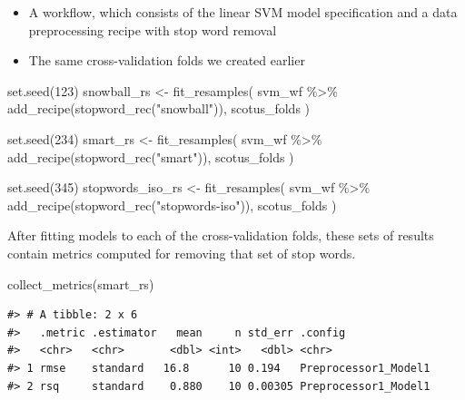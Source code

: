 \documentclass[
]{krantz}
\makeatletter
\newenvironment{Shaded}{\begin{snugshade}}{\end{snugshade}}
\newcommand{\DecValTok}[1]{\textcolor[rgb]{0.00,0.00,0.81}{#1}}
\newcommand{\FunctionTok}[1]{\textcolor[rgb]{0.00,0.00,0.00}{#1}}
\newcommand{\NormalTok}[1]{#1}
\newcommand{\OtherTok}[1]{\textcolor[rgb]{0.56,0.35,0.01}{#1}}
\newcommand{\SpecialCharTok}[1]{\textcolor[rgb]{0.00,0.00,0.00}{#1}}
\newcommand{\StringTok}[1]{\textcolor[rgb]{0.31,0.60,0.02}{#1}}
\newenvironment{kframe}{%
\medskip{}
\setlength{\fboxsep}{.8em}
 \def\at@end@of@kframe{}%
 \ifinner\ifhmode%
  \def\at@end@of@kframe{\end{minipage}}%
  \begin{minipage}{\columnwidth}%
 \fi\fi%
 \def\FrameCommand##1{\hskip\@totalleftmargin \hskip-\fboxsep
 \colorbox{shadecolor}{##1}\hskip-\fboxsep
     \hskip-\linewidth \hskip-\@totalleftmargin \hskip\columnwidth}%
 \MakeFramed {\advance\hsize-\width
   \@totalleftmargin\z@ \linewidth\hsize
   \@setminipage}}%
 {\par\unskip\endMakeFramed%
 \at@end@of@kframe}
\renewenvironment{Shaded}{\begin{kframe}}{\end{kframe}}
\makeatother
\begin{document}
\begin{itemize}
\item
  A workflow, which consists of the linear SVM model specification and a data preprocessing recipe with stop word removal
\item
  The same cross-validation folds we created earlier
\end{itemize}

\begin{Shaded}
\begin{Highlighting}[]
\FunctionTok{set.seed}\NormalTok{(}\DecValTok{123}\NormalTok{)}
\NormalTok{snowball\_rs }\OtherTok{\textless{}{-}} \FunctionTok{fit\_resamples}\NormalTok{(}
\NormalTok{  svm\_wf }\SpecialCharTok{\%\textgreater{}\%} \FunctionTok{add\_recipe}\NormalTok{(}\FunctionTok{stopword\_rec}\NormalTok{(}\StringTok{"snowball"}\NormalTok{)),}
\NormalTok{  scotus\_folds}
\NormalTok{)}

\FunctionTok{set.seed}\NormalTok{(}\DecValTok{234}\NormalTok{)}
\NormalTok{smart\_rs }\OtherTok{\textless{}{-}} \FunctionTok{fit\_resamples}\NormalTok{(}
\NormalTok{  svm\_wf }\SpecialCharTok{\%\textgreater{}\%} \FunctionTok{add\_recipe}\NormalTok{(}\FunctionTok{stopword\_rec}\NormalTok{(}\StringTok{"smart"}\NormalTok{)),}
\NormalTok{  scotus\_folds}
\NormalTok{)}

\FunctionTok{set.seed}\NormalTok{(}\DecValTok{345}\NormalTok{)}
\NormalTok{stopwords\_iso\_rs }\OtherTok{\textless{}{-}} \FunctionTok{fit\_resamples}\NormalTok{(}
\NormalTok{  svm\_wf }\SpecialCharTok{\%\textgreater{}\%} \FunctionTok{add\_recipe}\NormalTok{(}\FunctionTok{stopword\_rec}\NormalTok{(}\StringTok{"stopwords{-}iso"}\NormalTok{)),}
\NormalTok{  scotus\_folds}
\NormalTok{)}
\end{Highlighting}
\end{Shaded}

After fitting models to each of the cross-validation folds, these sets of results contain metrics computed for removing that set of stop words.

\begin{Shaded}
\begin{Highlighting}[]
\FunctionTok{collect\_metrics}\NormalTok{(smart\_rs)}
\end{Highlighting}
\end{Shaded}

\begin{verbatim}
#> # A tibble: 2 x 6
#>   .metric .estimator   mean     n std_err .config             
#>   <chr>   <chr>       <dbl> <int>   <dbl> <chr>               
#> 1 rmse    standard   16.8      10 0.194   Preprocessor1_Model1
#> 2 rsq     standard    0.880    10 0.00305 Preprocessor1_Model1
\end{verbatim}
\end{document}
